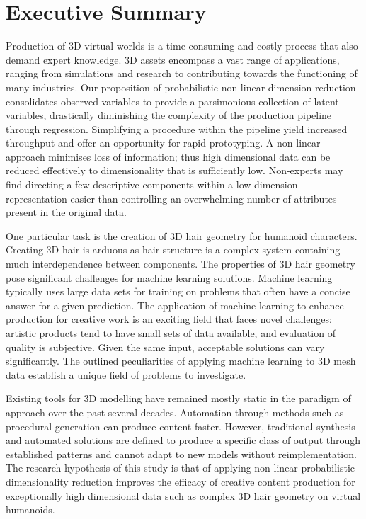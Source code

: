 \documentclass[ %
author={Dillon Keith Diep},
supervisor={Dr. Carl Henrik Ek},
degree={MEng},
title={ART-CG Hair:},
subtitle={Assisted Real-time Content Generation of Stylised Virtual Hair},
type={Research},
year={2017} ]{dissertation}
\begin{document}
\chapter*{Executive Summary}
Production of 3D virtual worlds is a time-consuming and costly process that also demand expert knowledge. 3D assets encompass a vast range of applications, ranging from simulations and research to contributing towards the functioning of many industries. Our proposition of probabilistic non-linear dimension reduction consolidates observed variables to provide a parsimonious collection of latent variables, drastically diminishing the complexity of the production pipeline through regression. Simplifying a procedure within the pipeline yield increased throughput and offer an opportunity for rapid prototyping. A non-linear approach minimises loss of information; thus high dimensional data can be reduced effectively to dimensionality that is sufficiently low. Non-experts may find directing a few descriptive components within a low dimension representation easier than controlling an overwhelming number of attributes present in the original data.

One particular task is the creation of 3D hair geometry for humanoid characters. Creating 3D hair is arduous as hair structure is a complex system containing much interdependence between components. The properties of 3D hair geometry pose significant challenges for machine learning solutions. Machine learning typically uses large data sets for training on problems that often have a concise answer for a given prediction. The application of machine learning to enhance production for creative work is an exciting field that faces novel challenges: artistic products tend to have small sets of data available, and evaluation of quality is subjective. Given the same input, acceptable solutions can vary significantly. The outlined peculiarities of applying machine learning to 3D mesh data establish a unique field of problems to investigate.

Existing tools for 3D modelling have remained mostly static in the paradigm of approach over the past several decades. Automation through methods such as procedural generation can produce content faster. However, traditional synthesis and automated solutions are defined to produce a specific class of output through established patterns and cannot adapt to new models without reimplementation. The research hypothesis of this study is that of applying non-linear probabilistic dimensionality reduction improves the efficacy of creative content production for exceptionally high dimensional data such as complex 3D hair geometry on virtual humanoids.
\end{document}
